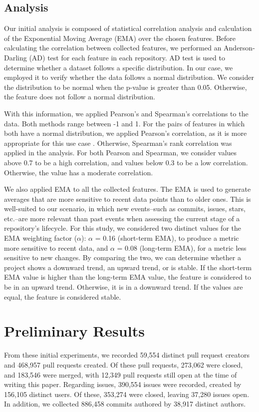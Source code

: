 \documentclass[10pt,conference,peerreview]{IEEEtran}
\begin{document}
\subsection{Analysis}
\label{analysis}
Our initial analysis is composed of statistical correlation analysis and calculation of the Exponential Moving Average (EMA) over the chosen features.
Before calculating the correlation between collected features, we performed an Anderson-Darling (AD) test \cite{anderson.darling} for each feature in each repository. AD test is used to determine whether a dataset follows a specific distribution. In our case, we employed it to verify whether the data follows a normal distribution. We consider the distribution to be normal when the p-value is greater than 0.05. Otherwise, the feature does not follow a normal distribution.

With this information, we applied Pearson's and Spearman's correlations to the data. Both methods range between -1 and 1. For the pairs of features in which both have a normal distribution, we applied Pearson's correlation, as it is more appropriate for this use case \cite{pearson.spearman}. Otherwise, Spearman's rank correlation was applied in the analysis. For both Pearson and Spearman, we consider values above 0.7 to be a high correlation, and values below 0.3 to be a low correlation. Otherwise, the value has a moderate correlation.

We also applied EMA to all the collected features. The EMA is used to generate averages that are more sensitive to recent data points than to older ones. This is well-suited to our scenario, in which new events--such as commits, issues, stars, etc.--are more relevant than past events when assessing the current stage of a repository's lifecycle. For this study, we considered two distinct values for the EMA weighting factor ($\alpha$): $\alpha$ = 0.16 (short-term EMA), to produce a metric more sensitive to recent data, and $\alpha$ = 0.08 (long-term EMA), for a metric less sensitive to new changes. By comparing the two, we can determine whether a project shows a downward trend, an upward trend, or is stable. If the short-term EMA value is higher than the long-term EMA value, the feature is considered to be in an upward trend. Otherwise, it is in a downward trend. If the values are equal, the feature is considered stable.

\section{Preliminary Results}
\label{sec:results}
From these initial experiments, we recorded 59,554 distinct pull request creators and 468,957 pull requests created. Of these pull requests, 273,062 were closed, and 183,546 were merged, with 12,349 pull requests still open at the time of writing this paper. Regarding issues, 390,554 issues were recorded, created by 156,105 distinct users. Of these, 353,274 were closed, leaving 37,280 issues open. In addition, we collected 886,458 commits authored by 38,917 distinct authors.
\end{document}
